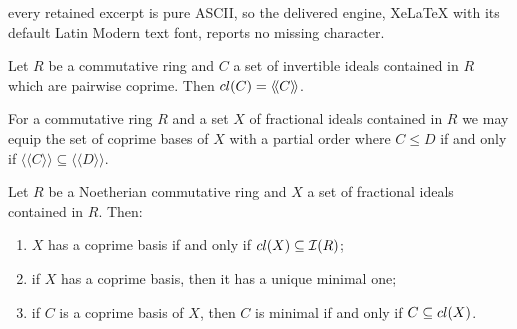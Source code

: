 \documentclass[10pt,a4paper]{amsart}
\newcommand{\lla}{\langle\!\langle}
\newcommand{\rra}{\rangle\!\rangle}
\begin{document}
every retained excerpt is pure ASCII, so the delivered engine, XeLaTeX with its default Latin Modern text font, reports no missing character.
\begin{lemma}\label{lem:closure_is_monoid}
Let \(R\) be a commutative ring and \(C\) a set of invertible ideals contained in \(R\) which are pairwise coprime. Then \(\textup{cl}(C)=\lla C\rra\).
\end{lemma}

\begin{lemma}\label{lem:coprime_basis_partial_order}
For a commutative ring \(R\) and a set \(X\) of fractional ideals contained in \(R\) we may equip the set of coprime bases of \(X\) with a partial order where \(C\leq D\) if and only if \(\lla C\rra\subseteq\lla D\rra\).
\end{lemma}

\begin{proposition}\label{prop:closure}
Let \(R\) be a Noetherian commutative ring and \(X\) a set of fractional ideals contained in \(R\). Then:
\begin{enumerate}[nosep,label=\textup{(\roman*)}]
\item \(X\) has a coprime basis if and only if \(\textup{cl}(X)\subseteq\mathcal{I}(R)\);
\item if \(X\) has a coprime basis, then it has a unique minimal one;
\item if \(C\) is a coprime basis of \(X\), then \(C\) is minimal if and only if \(C\subseteq\textup{cl}(X)\).
\end{enumerate}
\end{proposition}
\end{document}
